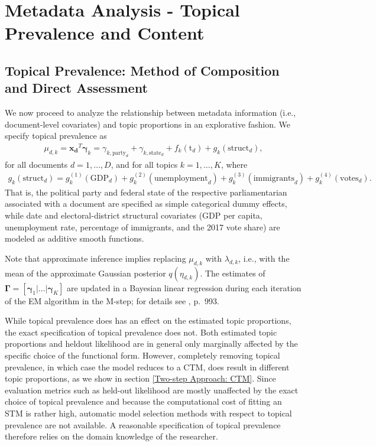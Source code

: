 \section{Metadata Analysis - Topical Prevalence and Content}
\label{Metadata Analysis - Topical Prevalence and Content}

\subsection{Topical Prevalence: Method of Composition and Direct Assessment}
\label{Covariate-level Topic Analysis}

We now proceed to analyze the relationship between metadata information (i.e., document-level covariates) and topic proportions in an explorative fashion. We specify topical prevalence as 
\begin{align}
\mu_{d,k} = \boldsymbol{x_d}^T \boldsymbol{\gamma}_k= \gamma_{k,\text{party}_d} + \gamma_{k,\text{state}_d} + f_k(\text{t}_d) + g_k(\text{struct}_d), \label{prevalence}
\end{align} 
for all documents $d = 1,\dots,D$, and for all topics $k = 1,\dots,K$, where 
\begin{align*}
g_k(\text{struct}_d) = g_{k}^{(1)}(\text{GDP}_d)+g_{k}^{(2)}(\text{unemployment}_d)+g_{k}^{(3)}(\text{immigrants}_d)+g_{k}^{(4)}(\text{votes}_d). 
\end{align*} 
That is, the political party and federal state of the respective parliamentarian associated with a document are specified as simple categorical dummy effects, while date and electoral-district structural covariates (GDP per capita, unemployment rate, percentage of immigrants, and the 2017 vote share) are modeled as additive smooth functions.

Note that approximate inference implies replacing $\mu_{d,k}$ with $\lambda_{d,k}$, i.e., with the mean of the approximate Gaussian posterior $q(\eta_{d,k})$. The estimates of $\boldsymbol{\Gamma} = [\boldsymbol{\gamma}_1 | \dots | \boldsymbol{\gamma}_K]$ are updated in a Bayesian linear regression during each iteration of the EM algorithm in the M-step; for details see \cite{roberts2013structural}, p.\ 993.

While topical prevalence does has an effect on the estimated topic proportions, the exact specification of topical prevalence does not. Both estimated topic proportions and heldout likelihood are in general only marginally affected by the specific choice of the functional form. However, completely removing topical prevalence, in which case the model reduces to a CTM, does result in different topic proportions, as we show in section \ref{Two-step Approach: CTM}. Since evaluation metrics such as held-out likelihood are mostly unaffected by the exact choice of topical prevalence and because the computational cost of fitting an STM is rather high, automatic model selection methods with respect to topical prevalence are not available. A reasonable specification of topical prevalence therefore relies on the domain knowledge of the researcher.

